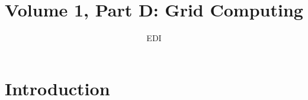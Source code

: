 \documentclass[a4paper,twoside]{scrbook}
\begin{document}
\title{Volume 1, Part D: Grid Computing}
\author{EDI}
\frontmatter
\maketitle
\tableofcontents
\mainmatter

\chapter{Introduction}
\end{document}
